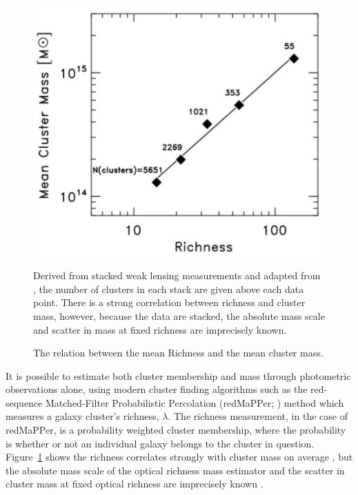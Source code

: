 \begin{figure}[!ht]
	\begin{center}
		\includegraphics[height=0.5\textheight]{figures/massrichness.pdf}
	\end{center}
	\caption{The relation between the mean Richness and the mean cluster mass.} 
	Derived from stacked weak lensing measurements and adapted from \citealt{Rozo2010}, the number of clusters in each stack are given above each data point. There is a strong correlation between richness and cluster mass, however, because the data are stacked, the absolute mass scale and scatter in mass at fixed richness are imprecisely known.
	\label{fig:massrichness}
\end{figure}

It is possible to estimate both cluster membership and mass through photometric observations alone, using modern cluster finding algorithms such as the red-sequence Matched-Filter Probabilistic Percolation (redMaPPer; \citealt{Rykoff2014}) method which measures a galaxy cluster's richness, $\lambda$. The richness measurement, in the case of redMaPPer, is a probability weighted cluster membership, where the probability is whether or not an individual galaxy belongs to the cluster in question. Figure~\ref{fig:massrichness} shows the richness correlates strongly with cluster mass on average , but the absolute mass scale of the optical richness mass estimator and the scatter in cluster mass at fixed optical richness are imprecisely known \citep{Rykoff2012}.

